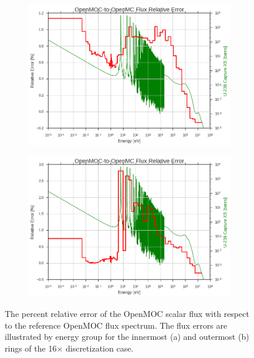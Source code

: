 \begin{figure}[h!]
\begin{subfigure}{\linewidth}
  \centering
  \includegraphics[width=0.9\linewidth]{figures/biases/pin-cell/rel-err-fuel-inner}
  \caption{}
\end{subfigure}
\begin{subfigure}{\linewidth}
  \centering
  \includegraphics[width=0.9\linewidth]{figures/biases/pin-cell/rel-err-fuel-outer}
  \caption{}
\end{subfigure}
\label{fig:chap2-pin-rel-err}
\caption[Flux relative error by group for a 2D fuel pin.]{The percent relative error of the OpenMOC scalar flux with respect to the reference OpenMOC flux spectrum. The flux errors are illustrated by energy group for the innermost (a) and outermost (b) rings of the 16$\times$ discretization case.}
\end{figure}


